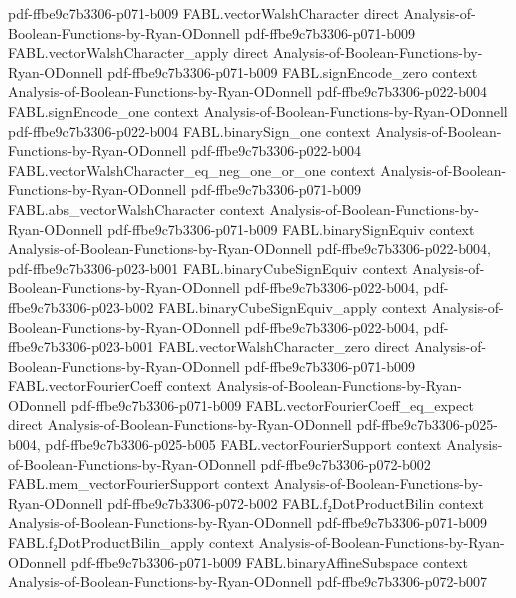 \begin{theorem}
  {pdf-ffbe9c7b3306-p071-b009}
\proofstep
  {FABL.vectorWalshCharacter}
  {direct}
  {Analysis-of-Boolean-Functions-by-Ryan-ODonnell}
  {pdf-ffbe9c7b3306-p071-b009}
\proofstep
  {FABL.vectorWalshCharacter_apply}
  {direct}
  {Analysis-of-Boolean-Functions-by-Ryan-ODonnell}
  {pdf-ffbe9c7b3306-p071-b009}
\proofstep
  {FABL.signEncode_zero}
  {context}
  {Analysis-of-Boolean-Functions-by-Ryan-ODonnell}
  {pdf-ffbe9c7b3306-p022-b004}
\proofstep
  {FABL.signEncode_one}
  {context}
  {Analysis-of-Boolean-Functions-by-Ryan-ODonnell}
  {pdf-ffbe9c7b3306-p022-b004}
\proofstep
  {FABL.binarySign_one}
  {context}
  {Analysis-of-Boolean-Functions-by-Ryan-ODonnell}
  {pdf-ffbe9c7b3306-p022-b004}
\proofstep
  {FABL.vectorWalshCharacter_eq_neg_one_or_one}
  {context}
  {Analysis-of-Boolean-Functions-by-Ryan-ODonnell}
  {pdf-ffbe9c7b3306-p071-b009}
\proofstep
  {FABL.abs_vectorWalshCharacter}
  {context}
  {Analysis-of-Boolean-Functions-by-Ryan-ODonnell}
  {pdf-ffbe9c7b3306-p071-b009}
\proofstep
  {FABL.binarySignEquiv}
  {context}
  {Analysis-of-Boolean-Functions-by-Ryan-ODonnell}
  {pdf-ffbe9c7b3306-p022-b004,
    pdf-ffbe9c7b3306-p023-b001}
\proofstep
  {FABL.binaryCubeSignEquiv}
  {context}
  {Analysis-of-Boolean-Functions-by-Ryan-ODonnell}
  {pdf-ffbe9c7b3306-p022-b004,
    pdf-ffbe9c7b3306-p023-b002}
\proofstep
  {FABL.binaryCubeSignEquiv_apply}
  {context}
  {Analysis-of-Boolean-Functions-by-Ryan-ODonnell}
  {pdf-ffbe9c7b3306-p022-b004,
    pdf-ffbe9c7b3306-p023-b001}
\proofstep
  {FABL.vectorWalshCharacter_zero}
  {direct}
  {Analysis-of-Boolean-Functions-by-Ryan-ODonnell}
  {pdf-ffbe9c7b3306-p071-b009}
\proofstep
  {FABL.vectorFourierCoeff}
  {context}
  {Analysis-of-Boolean-Functions-by-Ryan-ODonnell}
  {pdf-ffbe9c7b3306-p071-b009}
\proofstep
  {FABL.vectorFourierCoeff_eq_expect}
  {direct}
  {Analysis-of-Boolean-Functions-by-Ryan-ODonnell}
  {pdf-ffbe9c7b3306-p025-b004,
    pdf-ffbe9c7b3306-p025-b005}
\proofstep
  {FABL.vectorFourierSupport}
  {context}
  {Analysis-of-Boolean-Functions-by-Ryan-ODonnell}
  {pdf-ffbe9c7b3306-p072-b002}
\proofstep
  {FABL.mem_vectorFourierSupport}
  {context}
  {Analysis-of-Boolean-Functions-by-Ryan-ODonnell}
  {pdf-ffbe9c7b3306-p072-b002}
\proofstep
  {FABL.f₂DotProductBilin}
  {context}
  {Analysis-of-Boolean-Functions-by-Ryan-ODonnell}
  {pdf-ffbe9c7b3306-p071-b009}
\proofstep
  {FABL.f₂DotProductBilin_apply}
  {context}
  {Analysis-of-Boolean-Functions-by-Ryan-ODonnell}
  {pdf-ffbe9c7b3306-p071-b009}
\proofstep
  {FABL.binaryAffineSubspace}
  {context}
  {Analysis-of-Boolean-Functions-by-Ryan-ODonnell}
  {pdf-ffbe9c7b3306-p072-b007}

\end{theorem}
